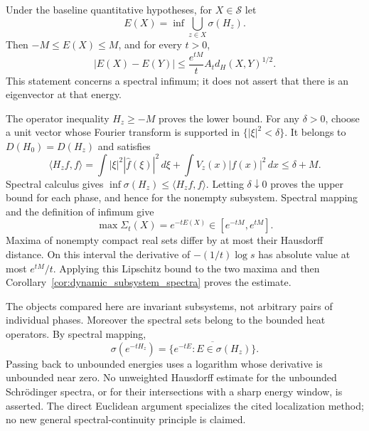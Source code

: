 \begin{corollary}
Under the baseline quantitative hypotheses, for $X\in\mathcal S$ let
\[
E(X)=\inf\bigcup_{z\in X}\sigma(H_z).
\]
Then $-M\leq E(X)\leq M$, and for every $t>0$,
\[
|E(X)-E(Y)|\leq\frac{e^{tM}}{t}A_t d_H(X,Y)^{1/2}.
\]
This statement concerns a spectral infimum; it does not assert that
there is an eigenvector at that energy.
\end{corollary}
\Proof
The operator inequality $H_z\geq-M$ proves the lower bound.
For any $\delta>0$, choose a unit vector whose Fourier transform is
supported in $\{|\xi|^2<\delta\}$. It belongs to $D(H_0)=D(H_z)$
and satisfies
\[
\langle H_zf,f\rangle
 =\int |\xi|^2|\widehat f(\xi)|^2\,d\xi
   +\int V_z(x)|f(x)|^2\,dx\leq\delta+M.
\]
Spectral calculus gives $\inf\sigma(H_z)\leq\langle H_zf,f\rangle$.
Letting $\delta\downarrow0$ proves the upper bound for each phase,
and hence for the nonempty subsystem.
Spectral mapping and the definition of infimum give
\[
\max\Sigma_t(X)=e^{-tE(X)}\in[e^{-tM},e^{tM}].
\]
Maxima of nonempty compact real sets differ by at most their Hausdorff
distance. On this interval the derivative of $-(1/t)\log s$ has
absolute value at most $e^{tM}/t$. Applying this Lipschitz bound to the
two maxima and then Corollary~\ref{cor:dynamic_subsystem_spectra}
proves the estimate.
\Done

The objects compared here are invariant subsystems, not arbitrary pairs
of individual phases. Moreover the spectral sets belong to the bounded
heat operators. By spectral mapping,
\[
\sigma(e^{-tH_z})=\overline{\{e^{-tE}:E\in\sigma(H_z)\}}.
\]
Passing back to unbounded energies uses a logarithm whose derivative
is unbounded near zero. No unweighted Hausdorff estimate for the
unbounded Schr\"odinger spectra, or for their intersections with a
sharp energy window, is asserted. The direct Euclidean argument specializes the cited localization
method; no new general spectral-continuity principle is claimed.

